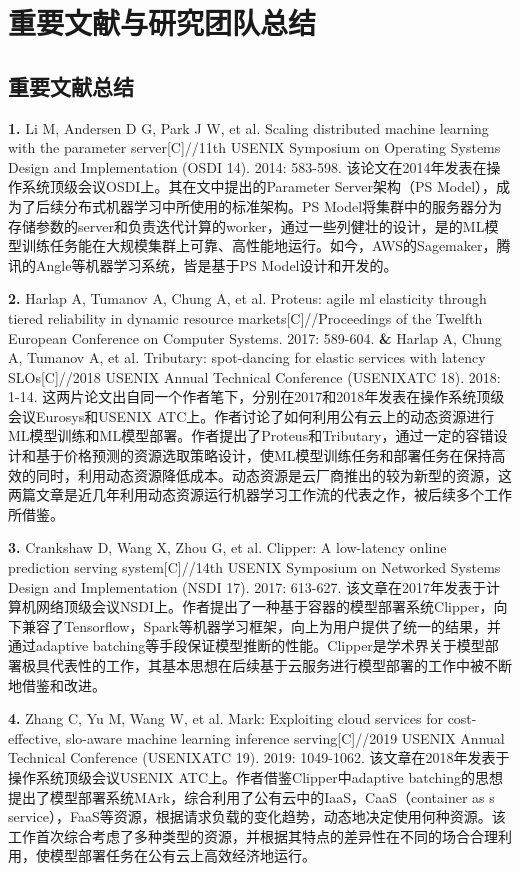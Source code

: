 \chapter{重要文献与研究团队总结}

\section{重要文献总结}
\textbf{1. }Li M, Andersen D G, Park J W, et al. Scaling distributed machine learning with the parameter server[C]//11th {USENIX} Symposium on Operating Systems Design and Implementation ({OSDI} 14). 2014: 583-598. 该论文在2014年发表在操作系统顶级会议OSDI上。其在文中提出的Parameter Server架构（PS Model），成为了后续分布式机器学习中所使用的标准架构。PS Model将集群中的服务器分为存储参数的server和负责迭代计算的worker，通过一些列健壮的设计，是的ML模型训练任务能在大规模集群上可靠、高性能地运行。如今，AWS的Sagemaker\parencite{joshi2020amazon}，腾讯的Angle等机器学习系统，皆是基于PS Model设计和开发的。

\textbf{2. }Harlap A, Tumanov A, Chung A, et al. Proteus: agile ml elasticity through tiered reliability in dynamic resource markets[C]//Proceedings of the Twelfth European Conference on Computer Systems. 2017: 589-604. \textbf{\&} Harlap A, Chung A, Tumanov A, et al. Tributary: spot-dancing for elastic services with latency SLOs[C]//2018 {USENIX} Annual Technical Conference ({USENIX}{ATC} 18). 2018: 1-14. 这两片论文出自同一个作者笔下，分别在2017和2018年发表在操作系统顶级会议Eurosys和USENIX ATC上。作者讨论了如何利用公有云上的动态资源进行ML模型训练和ML模型部署。作者提出了Proteus和Tributary，通过一定的容错设计和基于价格预测的资源选取策略设计，使ML模型训练任务和部署任务在保持高效的同时，利用动态资源降低成本。动态资源是云厂商推出的较为新型的资源，这两篇文章是近几年利用动态资源运行机器学习工作流的代表之作，被后续多个工作\parencite{li2020spottune}所借鉴。

\textbf{3. }Crankshaw D, Wang X, Zhou G, et al. Clipper: A low-latency online prediction serving system[C]//14th {USENIX} Symposium on Networked Systems Design and Implementation ({NSDI} 17). 2017: 613-627. 该文章在2017年发表于计算机网络顶级会议NSDI上。作者提出了一种基于容器的模型部署系统Clipper，向下兼容了Tensorflow，Spark等机器学习框架，向上为用户提供了统一的结果，并通过adaptive batching等手段保证模型推断的性能。Clipper是学术界关于模型部署极具代表性的工作，其基本思想在后续基于云服务进行模型部署的工作中\parencite{zhang2019mark}被不断地借鉴和改进。

\textbf{4. }Zhang C, Yu M, Wang W, et al. Mark: Exploiting cloud services for cost-effective, slo-aware machine learning inference serving[C]//2019 {USENIX} Annual Technical Conference ({USENIX}{ATC} 19). 2019: 1049-1062. 该文章在2018年发表于操作系统顶级会议USENIX ATC上。作者借鉴Clipper中adaptive batching的思想提出了模型部署系统MArk，综合利用了公有云中的IaaS，CaaS（container as s service），FaaS等资源，根据请求负载的变化趋势，动态地决定使用何种资源。该工作首次综合考虑了多种类型的资源，并根据其特点的差异性在不同的场合合理利用，使模型部署任务在公有云上高效经济地运行。


